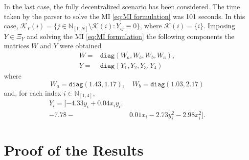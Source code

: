 \documentclass[10pt,twocolumn,twoside]{IEEEtran}
\theoremstyle{plain}
\theoremstyle{definition}
\theoremstyle{remark}
\begin{document}
In the last case, the fully decentralized scenario has been considered. The time taken by the parser to solve the MI \eqref{eq:MI formulation} was 101 seconds. In this case, $\mathscr{K}_Y(i)=\{j\in\mathbb{N}_{[1,N]}\setminus\mathscr{K}(i):Y_{ij}\equiv0\}$, where $\mathscr{K}(i)=\{i\}$. Imposing $Y\in\Xi_Y$ and solving the MI \eqref{eq:MI formulation} the following components the matrices $W$ and $Y$ were obtained
\begin{align*}
 W=&\mathbin{\mathtt{diag}}\left(W_a,W_b,W_b,W_a\right),\\
 Y=&\mathbin{\mathtt{diag}}\left(Y_1,Y_2,Y_3,Y_4\right)
\end{align*}
where
\begin{equation*}
		W_a=\mathbin{\mathtt{diag}}\left(
 1.43,1.17\right),\quad W_b=\mathbin{\mathtt{diag}}\left(1.03,2.17\right)
\end{equation*}
and, for each index $i\in\mathbb{N}_{[1,4]}$,
\begin{align*}
 Y_i=[-4.33y_i+0.04x_iy_i,\\
 -7.78-&0.01x_i-2.73y_i^2-2.98x_i^2].
\end{align*}

\section{Proof of the Results}\label{sec:Proof of the Results}
\end{document}
